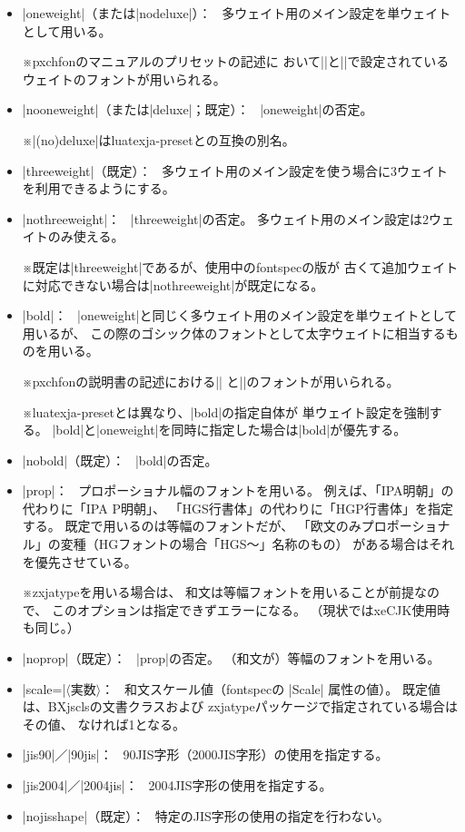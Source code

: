 \documentclass[xelatex,ja=standard,jafont=ipaex,
  a4paper]{bxjsarticle}
\newcommand{\Pkg}[1]{\textsf{#1}}
\newcommand{\Meta}[1]{$\langle$\mbox{}#1\mbox{}$\rangle$}
\newcommand{\Note}{\par\noindent ※}
\newcommand{\Means}{：\ }
\newcommand{\JSl}{\mbox{／}\linebreak[0]}
\begin{document}
\begin{itemize}
\item |oneweight|（または|nodeluxe|）\Means
多ウェイト用のメイン設定を単ウェイトとして用いる。
\Note \Pkg{pxchfon}のマニュアルのプリセットの記述に
おいて\>|\setminchofont|\>と\>|\setgothicfont|\>で設定されている
ウェイトのフォントが用いられる。
\item |nooneweight|（または|deluxe|；既定）\Means
|oneweight|\>の否定。
\Note |(no)deluxe|\>は\Pkg{luatexja-preset}との互換の別名。

\item |threeweight|（既定）\Means
多ウェイト用のメイン設定を使う場合に3ウェイトを利用できるようにする。
\item |nothreeweight|\Means
|threeweight|\>の否定。
多ウェイト用のメイン設定は2ウェイトのみ使える。
\Note 既定は\>|threeweight|\>であるが、使用中の\Pkg{fontspec}の版が
古くて追加ウェイトに対応できない場合は\>|nothreeweight|\>が既定になる。

\item |bold|\Means
|oneweight|\>と同じく多ウェイト用のメイン設定を単ウェイトとして用いるが、
この際のゴシック体のフォントとして太字ウェイトに相当するものを用いる。
\Note \Pkg{pxchfon}の説明書の記述における\>|\setminchofont|\>%
と\>|\setboldgothicfont|\>のフォントが用いられる。
\Note \Pkg{luatexja-preset}とは異なり、|bold|\>の指定自体が
単ウェイト設定を強制する。
|bold|\>と\>|oneweight|\>を同時に指定した場合は\>|bold|\>が優先する。
\item |nobold|（既定）\Means
|bold|\>の否定。

\item |prop|\Means
プロポーショナル幅のフォントを用いる。
例えば、「IPA明朝」の代わりに「IPA P明朝」、
「HGS行書体」の代わりに「HGP行書体」を指定する。
既定で用いるのは等幅のフォントだが、
「欧文のみプロポーショナル」の変種（HGフォントの場合「HGS～」名称のもの）
がある場合はそれを優先させている。
\Note \Pkg{zxjatype}を用いる場合は、
和文は等幅フォントを用いることが前提なので、
このオプションは指定できずエラーになる。
（現状では\Pkg{xeCJK}使用時も同じ。）
\item |noprop|（既定）\Means
|prop|\>の否定。
（和文が）等幅のフォントを用いる。

\item |scale=|\Meta{実数}\Means
和文スケール値（\Pkg{fontspec}の |Scale| 属性の値）。
既定値は、\Pkg{BXjscls}の文書クラスおよび
\Pkg{zxjatype}パッケージで指定されている場合はその値、
なければ1となる。

\item |jis90|\JSl|90jis|\Means
90JIS字形（2000JIS字形）の使用を指定する。
\item |jis2004|\JSl|2004jis|\Means
2004JIS字形の使用を指定する。
\item |nojisshape|（既定）\Means
特定のJIS字形の使用の指定を行わない。


\end{itemize}
\end{document}
